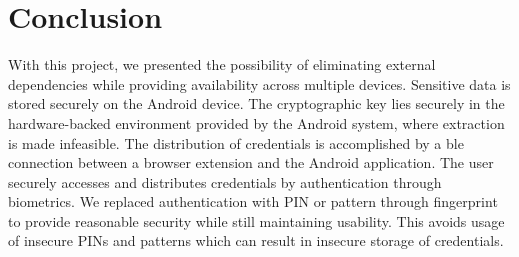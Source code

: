 \section{Conclusion} \label{conclusion}
With this project, we presented the possibility of eliminating external dependencies while providing availability across multiple devices. Sensitive data is stored securely on the Android device. The cryptographic key lies securely in the hardware-backed environment provided by the Android system, where extraction is made infeasible. The distribution of credentials is accomplished by a \gls{ble} connection between a browser extension and the Android application. The user securely accesses and distributes credentials by authentication through biometrics. We replaced authentication with PIN or pattern through fingerprint to provide reasonable security while still maintaining usability. This avoids usage of insecure PINs and patterns which can result in insecure storage of credentials.
